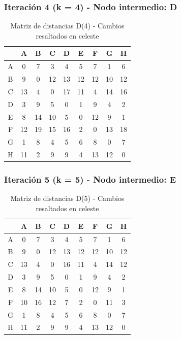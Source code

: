 \documentclass[12pt]{article}
\begin{document}
\subsubsection{Iteración 4 (k = 4) - Nodo intermedio: D}
\begin{table}[h!]
\centering
\begin{tabular}{|c|c|c|c|c|c|c|c|c|}
\hline
 & A & B & C & D & E & F & G & H \\\hline
A & 0 & 7 & 3 & 4 & \cellcolor{lightgreen} 5 & 7 & 1 & \cellcolor{lightgreen} 6 \\\hline
B & 9 & 0 & 12 & 13 & 12 & 12 & 10 & 12 \\\hline
C & 13 & 4 & 0 & 17 & 11 & 4 & 14 & 16 \\\hline
D & 3 & 9 & 5 & 0 & 1 & 9 & 4 & 2 \\\hline
E & \cellcolor{lightgreen} 8 & 14 & \cellcolor{lightgreen} 10 & 5 & 0 & 12 & \cellcolor{lightgreen} 9 & 1 \\\hline
F & 12 & 19 & 15 & 16 & 2 & 0 & 13 & \cellcolor{lightgreen} 18 \\\hline
G & 1 & 8 & 4 & 5 & \cellcolor{lightgreen} 6 & 8 & 0 & \cellcolor{lightgreen} 7 \\\hline
H & 11 & 2 & 9 & 9 & 4 & 13 & 12 & 0 \\\hline
\end{tabular}
\caption{Matriz de distancias D(4) - Cambios resaltados en celeste}
\end{table}

\subsubsection{Iteración 5 (k = 5) - Nodo intermedio: E}
\begin{table}[h!]
\centering
\begin{tabular}{|c|c|c|c|c|c|c|c|c|}
\hline
 & A & B & C & D & E & F & G & H \\\hline
A & 0 & 7 & 3 & 4 & 5 & 7 & 1 & 6 \\\hline
B & 9 & 0 & 12 & 13 & 12 & 12 & 10 & 12 \\\hline
C & 13 & 4 & 0 & \cellcolor{lightgreen} 16 & 11 & 4 & 14 & \cellcolor{lightgreen} 12 \\\hline
D & 3 & 9 & 5 & 0 & 1 & 9 & 4 & 2 \\\hline
E & 8 & 14 & 10 & 5 & 0 & 12 & 9 & 1 \\\hline
F & \cellcolor{lightgreen} 10 & \cellcolor{lightgreen} 16 & \cellcolor{lightgreen} 12 & \cellcolor{lightgreen} 7 & 2 & 0 & \cellcolor{lightgreen} 11 & \cellcolor{lightgreen} 3 \\\hline
G & 1 & 8 & 4 & 5 & 6 & 8 & 0 & 7 \\\hline
H & 11 & 2 & 9 & 9 & 4 & 13 & 12 & 0 \\\hline
\end{tabular}
\caption{Matriz de distancias D(5) - Cambios resaltados en celeste}
\end{table}
\end{document}
